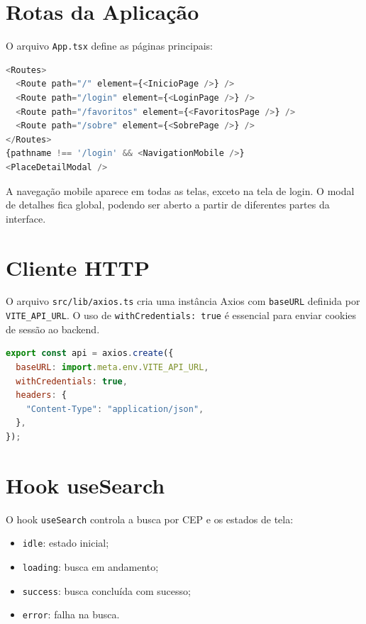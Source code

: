 \documentclass[
    12pt,
    oneside,
    openright,
    a4paper,
    english,
    brazil
]{abntex2}
\begin{document}
\section{Rotas da Aplicação}

O arquivo \texttt{App.tsx} define as páginas principais:

\begin{lstlisting}[language=JavaScript, caption={Rotas principais do frontend}]
<Routes>
  <Route path="/" element={<InicioPage />} />
  <Route path="/login" element={<LoginPage />} />
  <Route path="/favoritos" element={<FavoritosPage />} />
  <Route path="/sobre" element={<SobrePage />} />
</Routes>
{pathname !== '/login' && <NavigationMobile />}
<PlaceDetailModal />
\end{lstlisting}

A navegação mobile aparece em todas as telas, exceto na tela de login. O modal de detalhes fica global, podendo ser aberto a partir de diferentes partes da interface.

\section{Cliente HTTP}

O arquivo \texttt{src/lib/axios.ts} cria uma instância Axios com \texttt{baseURL} definida por \texttt{VITE\_API\_URL}. O uso de \texttt{withCredentials: true} é essencial para enviar cookies de sessão ao backend.

\begin{lstlisting}[language=JavaScript, caption={Cliente HTTP com credenciais}]
export const api = axios.create({
  baseURL: import.meta.env.VITE_API_URL,
  withCredentials: true,
  headers: {
    "Content-Type": "application/json",
  },
});
\end{lstlisting}

\section{Hook useSearch}

O hook \texttt{useSearch} controla a busca por CEP e os estados de tela:

\begin{itemize}
    \item \texttt{idle}: estado inicial;
    \item \texttt{loading}: busca em andamento;
    \item \texttt{success}: busca concluída com sucesso;
    \item \texttt{error}: falha na busca.
\end{itemize}
\end{document}
